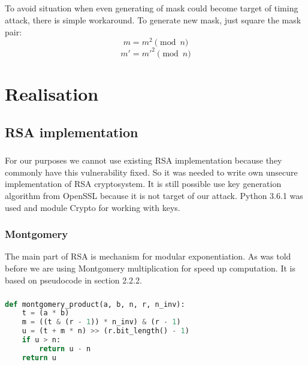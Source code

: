 \documentclass[thesis=B,english]{FITthesis}[2012/10/20]
\begin{document}
{\paragraph*{}{
To avoid situation when even generating of mask could become target of timing attack, there is simple workaround. To generate new mask, just square the mask pair:\cite{Kocher1996}
\[m = m^2 \pmod{n}\]
\[m' = m'^2 \pmod{n}\]

}

\chapter{Realisation}

\section{RSA implementation}

\paragraph*{}{
For our purposes we cannot use existing RSA implementation because they commonly have this vulnerability fixed. So it was needed to write own unsecure implementation of RSA cryptosystem.
It is still possible use key generation algorithm from OpenSSL because it is not target of our attack. Python 3.6.1 was used and module Crypto for working with keys.
}
\subsection{Montgomery}{
The main part of RSA is mechanism for modular exponentiation. As was told before we are using Montgomery multiplication for speed up computation. It is based on pseudocode in section 2.2.2.
}
\paragraph*{}
\begin{lstlisting}[language=Python]
def montgomery_product(a, b, n, r, n_inv):
    t = (a * b)
    m = ((t & (r - 1)) * n_inv) & (r - 1)
    u = (t + m * n) >> (r.bit_length() - 1)
    if u > n:
        return u - n
    return u
\end{lstlisting}

}
\end{document}
